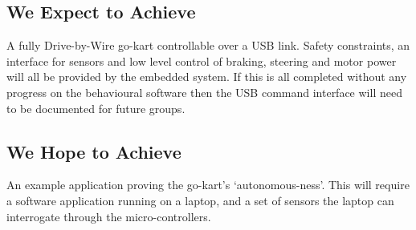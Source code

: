 \subsection{We Expect to Achieve}
A fully Drive-by-Wire go-kart controllable over a USB link. Safety constraints, an interface for sensors and low level control of braking, steering and motor power will all be provided by the embedded system. If this is all completed without any progress on the behavioural software then the USB command interface will need to be documented for future groups.

\subsection{We Hope to Achieve}
An example application proving the go-kart's `autonomous-ness'. This will require a software application running on a laptop, and a set of sensors the laptop can interrogate through the micro-controllers.
